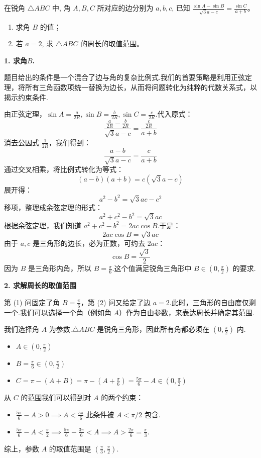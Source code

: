 \begin{prob}[topic={锐角三角形的取值范围}, score=12]
在锐角 $\triangle ABC$ 中, 角 $A, B, C$ 所对应的边分别为 $a, b, c$, 已知 $\frac{\sin A - \sin B}{\sqrt{3}a - c} = \frac{\sin C}{a+b}$。
\begin{enumerate}
	\item[(1)] 求角 $B$ 的值；
	\item[(2)] 若 $a=2$, 求 $\triangle ABC$ 的周长的取值范围。
\end{enumerate}
\end{prob}
\begin{prob-sol}
\textbf{1. 求角$B$.}

题目给出的条件是一个混合了边与角的复杂比例式.我们的首要策略是利用正弦定理，将所有三角函数项统一替换为边长，从而将问题转化为纯粹的代数关系式，以揭示约束条件.

由正弦定理，$\sin A = \frac{a}{2R}, \sin B = \frac{b}{2R}, \sin C = \frac{c}{2R}$.代入原式：
\[
\frac{\frac{a}{2R} - \frac{b}{2R}}{\sqrt{3}a - c} = \frac{\frac{c}{2R}}{a+b}
\]
消去公因式 $\frac{1}{2R}$，我们得到：
\[
\frac{a-b}{\sqrt{3}a - c} = \frac{c}{a+b}
\]
通过交叉相乘，将比例式转化为等式：
\[
(a-b)(a+b) = c(\sqrt{3}a - c)
\]
展开得：
\[
a^2 - b^2 = \sqrt{3}ac - c^2
\]
移项，整理成余弦定理的形式：
\[
a^2 + c^2 - b^2 = \sqrt{3}ac
\]
根据余弦定理，我们知道 $a^2 + c^2 - b^2 = 2ac\cos B$.于是：
\[
2ac\cos B = \sqrt{3}ac
\]
由于 $a,c$ 是三角形的边长，必为正数，可约去 $2ac$：
\[
\cos B = \frac{\sqrt{3}}{2}
\]
因为 $B$ 是三角形内角，所以 $B = \frac{\pi}{6}$.这个值满足锐角三角形中 $B \in (0, \frac{\pi}{2})$ 的要求.

\textbf{2. 求解周长的取值范围}

第 (1) 问固定了角 $B=\frac{\pi}{6}$，第 (2) 问又给定了边 $a=2$.此时，三角形的自由度仅剩一个.我们可以选择一个角（例如角 $A$）作为自由参数，来表达周长并确定其范围.

我们选择角 $A$ 为参数.$\triangle ABC$ 是锐角三角形，因此所有角都必须在 $(0, \frac{\pi}{2})$ 内.
\begin{itemize}
	\item $A \in (0, \frac{\pi}{2})$
	\item $B = \frac{\pi}{6} \in (0, \frac{\pi}{2})$ 
	\item $C = \pi - (A+B) = \pi - (A+\frac{\pi}{6}) = \frac{5\pi}{6} - A \in (0, \frac{\pi}{2})$
\end{itemize}
从 $C$ 的范围我们可以得到对 $A$ 的两个约束：
\begin{itemize}
	\item $\frac{5\pi}{6} - A > 0 \implies A < \frac{5\pi}{6}$.此条件被 $A < \pi/2$ 包含.
	\item $\frac{5\pi}{6} - A < \frac{\pi}{2} \implies \frac{5\pi}{6} - \frac{3\pi}{6} < A \implies A > \frac{2\pi}{6} = \frac{\pi}{3}$.
\end{itemize}
综上，参数 $A$ 的取值范围是 $(\frac{\pi}{3}, \frac{\pi}{2})$.


\end{prob-sol}
